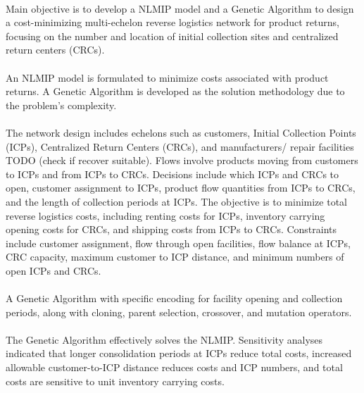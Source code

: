 \paragraph{} Main objective is to develop a NLMIP model and a Genetic Algorithm to design a cost-minimizing multi-echelon reverse logistics network for product returns, focusing on the number and location of initial collection sites and centralized return centers (CRCs).

\paragraph{} An NLMIP model is formulated to minimize costs associated with product returns. A Genetic Algorithm is developed as the solution methodology due to the problem's complexity.

\paragraph{} The network design includes echelons such as customers, Initial Collection Points (ICPs), Centralized Return Centers (CRCs), and manufacturers/ repair facilities TODO (check if recover suitable). Flows involve products moving from customers to ICPs and from ICPs to CRCs. Decisions include which ICPs and CRCs to open, customer assignment to ICPs, product flow quantities from ICPs to CRCs, and the length of collection periods at ICPs. The objective is to minimize total reverse logistics costs, including renting costs for ICPs, inventory carrying opening costs for CRCs, and shipping costs from ICPs to CRCs. Constraints include customer assignment, flow through open facilities, flow balance at ICPs, CRC capacity, maximum customer to ICP distance, and minimum numbers of open ICPs and CRCs.

\paragraph{} A Genetic Algorithm with specific encoding for facility opening and collection periods, along with cloning, parent selection, crossover, and mutation operators.

\paragraph{} The Genetic Algorithm effectively solves the NLMIP. Sensitivity analyses indicated that longer consolidation periods at ICPs reduce total costs, increased allowable customer-to-ICP distance reduces costs and ICP numbers, and total costs are sensitive to unit inventory carrying costs.

